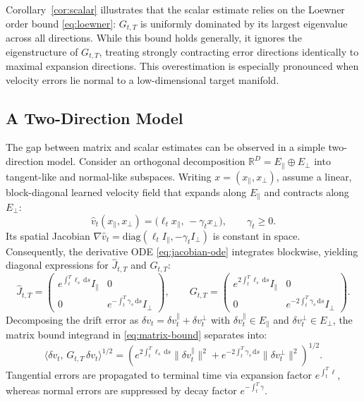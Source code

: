 \documentclass{article}
\newcommand{\R}{\mathbb{R}}
\newcommand{\dd}{\,\mathrm{d}}
\theoremstyle{plain}
\theoremstyle{definition}
\theoremstyle{remark}
\begin{document}
Corollary~\ref{cor:scalar} illustrates that the scalar estimate relies on the Loewner order bound \eqref{eq:loewner}: $G_{t,T}$ is uniformly dominated by its largest eigenvalue across all directions. While this bound holds generally, it ignores the eigenstructure of $G_{t,T}$, treating strongly contracting error directions identically to maximal expansion directions. This overestimation is especially pronounced when velocity errors lie normal to a low-dimensional target manifold.

\subsection{A Two-Direction Model}
\label{subsec:two-direction}

The gap between matrix and scalar estimates can be observed in a simple two-direction model. Consider an orthogonal decomposition $\R^D = E_\parallel \oplus E_\perp$ into tangent-like and normal-like subspaces. Writing $x = (x_\parallel, x_\perp)$, assume a linear, block-diagonal learned velocity field that expands along $E_\parallel$ and contracts along $E_\perp$:
\begin{equation}
  \hat{v}_t(x_\parallel, x_\perp) = \big(\ell_t x_\parallel, \, -\gamma_t x_\perp\big),
  \qquad \gamma_t \ge 0.
  \label{eq:block-field}
\end{equation}
Its spatial Jacobian $\nabla\hat{v}_t = \mathrm{diag}(\ell_t I_\parallel, -\gamma_t I_\perp)$ is constant in space. Consequently, the derivative ODE \eqref{eq:jacobian-ode} integrates blockwise, yielding diagonal expressions for $\hat{J}_{t,T}$ and $G_{t,T}$:
\begin{equation}
  \hat{J}_{t,T} =
  \begin{pmatrix}
    e^{\int_t^T \ell_s \dd s} I_\parallel & 0 \\[2pt]
    0 & e^{-\int_t^T \gamma_s \dd s} I_\perp
  \end{pmatrix},
  \qquad
  G_{t,T} =
  \begin{pmatrix}
    e^{2\int_t^T \ell_s \dd s} I_\parallel & 0 \\[2pt]
    0 & e^{-2\int_t^T \gamma_s \dd s} I_\perp
  \end{pmatrix}.
  \label{eq:block-G}
\end{equation}
Decomposing the drift error as $\delta v_t = \delta v_t^\parallel + \delta v_t^\perp$ with $\delta v_t^\parallel \in E_\parallel$ and $\delta v_t^\perp \in E_\perp$, the matrix bound integrand in \eqref{eq:matrix-bound} separates into:
\begin{equation}
  \big\langle \delta v_t,\, G_{t,T}\, \delta v_t \big\rangle^{1/2}
  = \left(e^{2\int_t^T \ell_s \dd s} \|\delta v_t^\parallel\|^2
       + e^{-2\int_t^T \gamma_s \dd s} \|\delta v_t^\perp\|^2\right)^{1/2}.
  \label{eq:block-integrand}
\end{equation}
Tangential errors are propagated to terminal time via expansion factor $e^{\int_t^T \ell}$, whereas normal errors are suppressed by decay factor $e^{-\int_t^T \gamma}$.
\end{document}
